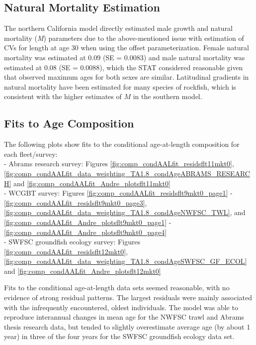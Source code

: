 \documentclass[11pt,
  english,
]{article}
\begin{document}
\hypertarget{natural-mortality-estimation}{%
\subsection{Natural Mortality Estimation}\label{natural-mortality-estimation}}

\leavevmode\tagmcend\tagstructend

The northern California model directly estimated male growth and natural mortality (\emph{M}) parameters due to the above-mentioned issue with estimation of CVs for length at age 30 when using the offset parameterization. Female natural mortality was estimated at 0.09 (SE = 0.0083) and male natural mortality was estimated at 0.08 (SE = 0.0088), which the STAT considered reasonable given that observed maximum ages for both sexes are similar. Latitudinal gradients in natural mortality have been estimated for many species of rockfish, which is consistent with the higher estimates of {\(M\)\leavevmode\tagmcend\tagstructend} in the southern model.


\hypertarget{fits-to-age-composition}{%
\subsection{Fits to Age Composition}\label{fits-to-age-composition}}

\leavevmode\tagmcend\tagstructend

The following plots show fits to the conditional age-at-length composition for each fleet/survey:\\
- Abrams research survey: Figures \ref{fig:comp_condAALfit_residsflt11mkt0}, \ref{fig:comp_condAALfit_data_weighting_TA1.8_condAgeABRAMS_RESEARCH} and \ref{fig:comp_condAALfit_Andre_plotsflt11mkt0}\\
- WCGBT survey: Figures \ref{fig:comp_condAALfit_residsflt9mkt0_page1} - \ref{fig:comp_condAALfit_residsflt9mkt0_page3}, \ref{fig:comp_condAALfit_data_weighting_TA1.8_condAgeNWFSC_TWL}, and \ref{fig:comp_condAALfit_Andre_plotsflt9mkt0_page1} - \ref{fig:comp_condAALfit_Andre_plotsflt9mkt0_page4}\\
- SWFSC groundfish ecology survey: Figures \ref{fig:comp_condAALfit_residsflt12mkt0}, \ref{fig:comp_condAALfit_data_weighting_TA1.8_condAgeSWFSC_GF_ECOL} and \ref{fig:comp_condAALfit_Andre_plotsflt12mkt0}

Fits to the conditional age-at-length data sets seemed reasonable, with no evidence of strong residual patterns. The largest residuals were mainly associated with the infrequently encountered, oldest individuals. The model was able to reproduce interannual changes in mean age for the NWFSC trawl and Abrams thesis research data, but tended to slightly overestimate average age (by about 1 year) in three of the four years for the SWFSC groundfish ecology data set.
\end{document}
